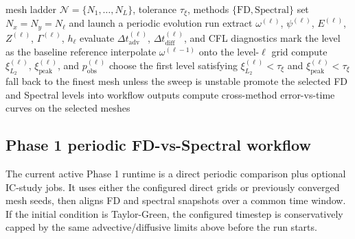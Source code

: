 \documentclass[11pt]{article}
\begin{document}
\begin{algorithm}[t]
\caption{Dedicated periodic mesh-convergence workflow}
\begin{algorithmic}[1]
\Require mesh ladder $\mathcal{N} = \{N_1,\dots,N_L\}$, tolerance $\tau_{\xi}$, methods $\{\mathrm{FD},\mathrm{Spectral}\}$
        \State set $N_x = N_y = N_{\ell}$ and launch a periodic evolution run
        \State extract $\omega^{(\ell)}$, $\psi^{(\ell)}$, $E^{(\ell)}$, $Z^{(\ell)}$, $\Gamma^{(\ell)}$, $h_{\ell}$
        \State evaluate $\Delta t_{\mathrm{adv}}^{(\ell)}$, $\Delta t_{\mathrm{diff}}^{(\ell)}$, and CFL diagnostics
            \State mark the level as the baseline reference
        \Else
            \State interpolate $\omega^{(\ell-1)}$ onto the level-$\ell$ grid
            \State compute $\xi_{L_2}^{(\ell)}$, $\xi_{\mathrm{peak}}^{(\ell)}$, and $p_{\mathrm{obs}}^{(\ell)}$
        \EndIf
    \EndFor
    \State choose the first level satisfying $\xi_{L_2}^{(\ell)} < \tau_{\xi}$ and $\xi_{\mathrm{peak}}^{(\ell)} < \tau_{\xi}$
        \State fall back to the finest mesh unless the sweep is unstable
    \EndIf
\EndFor
\State promote the selected FD and Spectral levels into workflow outputs
\State compute cross-method error-vs-time curves on the selected meshes
\end{algorithmic}
\end{algorithm}

\subsection*{Phase 1 periodic FD-vs-Spectral workflow}

The current active Phase 1 runtime is a direct periodic comparison plus optional IC-study jobs. It uses either the configured direct grids or previously converged mesh seeds, then aligns FD and spectral snapshots over a common time window. If the initial condition is Taylor-Green, the configured timestep is conservatively capped by the same advective/diffusive limits above before the run starts.
\end{document}
